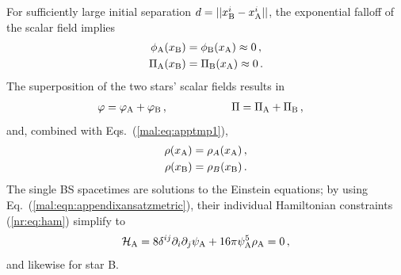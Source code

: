 For sufficiently large initial separation $d=||x_{\rm B}^i
-x_{\rm A}^i||$, the exponential falloff of the scalar field
implies
\begin{equation}
\begin{aligned}
    \phi_{\rm A}(x_{\rm B}) &= \phi_{\rm B}(x_{\rm A}) \approx 0\,, \\
     \Pi_{\rm A}(x_{\rm B}) &= \Pi_{\rm B}(x_{\rm A}) \approx 0\,.
\end{aligned}
\label{mal:eq:apptmp1}
\end{equation}
The superposition of the two stars' scalar fields results in
%
\begin{align}
  &\varphi = \varphi_{\rm A} + \varphi_{\rm B}\,,
  \hspace{0.85cm}~~~~~~~~~~
  \Pi = \Pi_{\rm A} + \Pi_{\rm B}\,,
\end{align}
%
and, combined with Eqs.~(\ref{mal:eq:apptmp1}),
\begin{equation}
\begin{aligned}
  \rho(x_{\rm A}) &= \rho_A(x_{\rm A})\,, \\
  \rho(x_{\rm B}) &= \rho_B(x_{\rm B})\,.
\end{aligned}\label{mal:eqn:energydensityconditon}
\end{equation}
The single BS spacetimes are solutions to the Einstein equations;
by using Eq.~(\ref{mal:eqn:appendixansatzmetric}), their individual
Hamiltonian constraints (\ref{nr:eq:ham}) simplify to
%
\begin{equation}
    \mathcal{H}_{\rm A} = 8 \delta^{ij} \partial_i\partial_j  \psi_{\rm A} +  16\pi \psi_{\rm A}^5\rho_{\rm A} = 0\,,
    \label{nr:eq:hamA}
\end{equation}
%
and likewise for star B.

